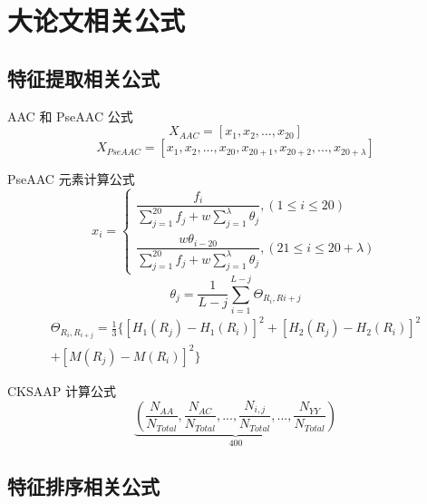 \section[大论文的相关公式]{大论文相关公式}

\subsection{特征提取相关公式}
AAC 和 PseAAC 公式
\begin{equation}
    X_{AAC}=\left [ x_{1},x_{2},...,x_{20} \right ]
\end{equation}
\begin{equation}
    X_{PseAAC}=\left [ x_{1},x_{2},...,x_{20},x_{20+1},x_{20+2},...,x_{20+\lambda}\right ]
\end{equation}

PseAAC 元素计算公式
\begin{equation}
    x_{i}=\begin{cases}
        \dfrac{f_{i}}{\sum_{j=1}^{20}f_{j}+w\sum_{j=1}^{\lambda}\theta_{j}},\left ( 1 \leq i \leq 20 \right ) \\
        \dfrac{w\theta_{i-20}}{\sum_{j=1}^{20}f_{j}+w\sum_{j=1}^{\lambda}\theta_{j}},\left ( 21\leq i \leq 20+\lambda \right )
    \end{cases}
\end{equation}
\begin{equation}
    \theta_{j}=\frac{1}{L-j}\sum_{i=1}^{L-j}\Theta_{R_{i},R{i+j}}
\end{equation}
\begin{multline}
    \Theta_{R_{i},R_{i+j}}=\frac{1}{3} \{ \left[ H_{1}(R_{j}) - H_{1}(R_{i}) \right]^2 + \left[ H_{2}(R_{j}) - H_{2}(R_{i}) \right]^2 \\
    + \left[ M(R_{j}) - M(R_{i}) \right]^2 \}
\end{multline}

CKSAAP 计算公式
\begin{equation}
    \underbrace{( \frac{N_{AA}}{N_{Total}},\frac{N_{AC}}{N_{Total}},...,\frac{N_{i,j}}{N_{Total}},...,\frac{N_{YY}}{N_{Total}} )}_{400}
\end{equation}

\subsection{特征排序相关公式}